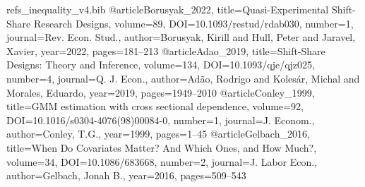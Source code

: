 \begin{filecontents*}[overwrite]{refs_inequality_v4.bib}
@article{Borusyak_2022, title={Quasi-Experimental Shift-Share Research Designs}, volume={89}, DOI={10.1093/restud/rdab030}, number={1}, journal={Rev. Econ. Stud.}, author={Borusyak, Kirill and Hull, Peter and Jaravel, Xavier}, year={2022}, pages={181--213} }
@article{Adao_2019, title={Shift-Share Designs: Theory and Inference}, volume={134}, DOI={10.1093/qje/qjz025}, number={4}, journal={Q. J. Econ.}, author={Ad\~ao, Rodrigo and Koles\'ar, Michal and Morales, Eduardo}, year={2019}, pages={1949--2010} }
@article{Conley_1999, title={{GMM} estimation with cross sectional dependence}, volume={92}, DOI={10.1016/s0304-4076(98)00084-0}, number={1}, journal={J. Econom.}, author={Conley, T.G.}, year={1999}, pages={1--45} }
@article{Gelbach_2016, title={When Do Covariates Matter? And Which Ones, and How Much?}, volume={34}, DOI={10.1086/683668}, number={2}, journal={J. Labor Econ.}, author={Gelbach, Jonah B.}, year={2016}, pages={509--543} }
\end{filecontents*}

\documentclass[review,3p,times,authoryear]{elsarticle}

\usepackage{lineno,hyperref}
\usepackage{amsmath,amssymb}
\usepackage{graphicx}
\usepackage{booktabs}
\usepackage{threeparttable}
\usepackage{multirow}
\usepackage{url}
\usepackage{float}

\providecommand{\DOIprefix}{}\renewcommand{\DOIprefix}{}
\providecommand{\URLprefix}{}\renewcommand{\URLprefix}{}
\providecommand{\doi}[1]{}\renewcommand{\doi}[1]{\href{https://doi.org/#1}{\nolinkurl{https://doi.org/#1}}}

\makeatletter
\long{}
\makeatother
{}

\newcommand{\sym}[1]{\ensuremath{^{#1}}}



